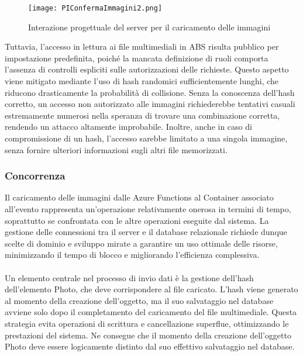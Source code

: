 \begin{figure}[h!]
    \centering
    \texttt{[image: PIConfermaImmagini2.png]}
    \caption{Interazione progettuale del server per il caricamento delle immagini }
\end{figure}

Tuttavia, l’accesso in lettura ai file multimediali in ABS risulta pubblico per impostazione predefinita, 
poiché la mancata definizione di ruoli comporta l’assenza di controlli espliciti sulle autorizzazioni delle richieste. 
Questo aspetto viene mitigato mediante l’uso di hash randomici sufficientemente lunghi, che riducono drasticamente la probabilità di collisione. 
Senza la conoscenza dell’hash corretto, un accesso non autorizzato alle immagini 
richiederebbe tentativi casuali estremamente numerosi nella speranza di trovare una combinazione corretta, rendendo un attacco altamente improbabile. 
Inoltre, anche in caso di compromissione di un hash, l’accesso sarebbe limitato a una singola immagine, senza fornire ulteriori informazioni sugli altri file memorizzati.

\clearpage

\subsubsection{Concorrenza }

Il caricamento delle immagini dalle Azure Functions al Container associato all’evento rappresenta un'operazione relativamente onerosa in termini di tempo, 
soprattutto se confrontata con le altre operazioni eseguite dal sistema. 
La gestione delle connessioni tra il server e il database relazionale richiede dunque scelte di dominio e sviluppo mirate a garantire un uso ottimale delle risorse, 
minimizzando il tempo di blocco e migliorando l'efficienza complessiva.\\
\\
Un elemento centrale nel processo di invio dati è la gestione dell’hash dell’elemento Photo, che deve corrispondere al file caricato. 
L’hash viene generato al momento della creazione dell’oggetto, ma il suo salvataggio nel database avviene solo dopo il completamento del caricamento del file multimediale. 
Questa strategia evita operazioni di scrittura e cancellazione superflue, ottimizzando le prestazioni del sistema. 
Ne consegue che il momento della creazione dell’oggetto Photo deve essere logicamente distinto dal suo effettivo salvataggio nel database.

